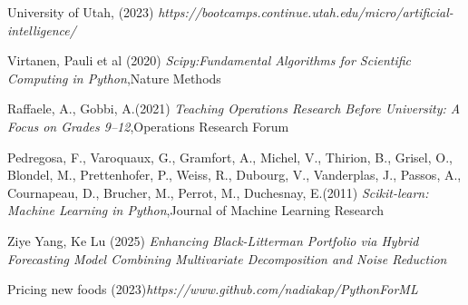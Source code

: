 \documentclass{article} %
\begin{document}
\begin{thebibliography}{9}
University of Utah, (2023) \emph{ https://bootcamps.continue.utah.edu/micro/artificial-intelligence/}

Virtanen, Pauli et al (2020) \emph{Scipy:Fundamental Algorithms for Scientific Computing in Python},Nature Methods


Raffaele, A., Gobbi, A.(2021) \emph{Teaching Operations Research Before University: A Focus on Grades 9–12},Operations Research Forum

Pedregosa, F., Varoquaux, G., Gramfort, A., Michel, V., Thirion, B., Grisel, O., Blondel, M., Prettenhofer, P., Weiss, R., Dubourg, V., Vanderplas, J., Passos, A., Cournapeau, D., Brucher, M., Perrot, M., Duchesnay, E.(2011) \emph{ Scikit-learn: Machine Learning in Python},Journal of Machine Learning Research

Ziye Yang, Ke Lu (2025) \emph{Enhancing Black-Litterman Portfolio via Hybrid Forecasting Model Combining Multivariate Decomposition and Noise Reduction}


Pricing new foods  (2023)\emph{https://www.github.com/nadiakap/PythonForML}

\end{thebibliography}
\end{document}
